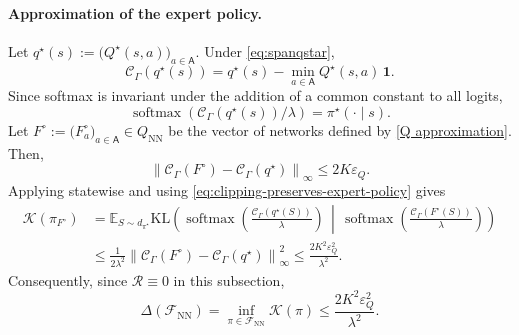 \documentclass{article}
\theoremstyle{definition}
\theoremstyle{remark}
\theoremstyle{plain}
\newcommand{\E}{\mathbb{E}}
\newcommand{\KL}{\mathrm{KL}}
\numberwithin{equation}{section}
\begin{document}
\paragraph{Approximation of the expert policy.} Let
\(
    q^\star(s)
    :=
    \bigl(
        Q^\star(s,a)
    \bigr)_{a\in\mathsf A}.
\)
Under \eqref{eq:spanqstar},
\begin{equation}
\label{eq:clipping-preserves-expert-policy}
    \mathcal C_\Gamma(q^\star(s))
    =
    q^\star(s)
    -
    \min_{a\in\mathsf A}Q^\star(s,a)\,\mathbf 1.
\end{equation}
Since softmax is invariant under the addition of a common constant to
all logits,
\[
    \operatorname{softmax}
    \left(
        {\mathcal C_\Gamma(q^\star(s))}/{\lambda}
    \right)
    =
    \pi^\star(\cdot\mid s).
\]
Let
\(
    F^\circ
    :=
    \bigl(
        F_a^\circ
    \bigr)_{a\in\mathsf A}
    \in
     Q_{\mathrm{NN}}
\)
be the vector of networks defined by
\eqref{Q approximation}. Then,
\begin{equation}
\label{eq:clipped-logit-approximation}
    \left\|
        \mathcal C_\Gamma(F^\circ)
        -
        \mathcal C_\Gamma(q^\star)
    \right\|_\infty
    \leq
    2K\varepsilon_Q.
\end{equation}
Applying  statewise and using
\eqref{eq:clipping-preserves-expert-policy} gives
\begin{align}
    \mathcal K(\pi_{F^\circ})
    &=
    \E_{S\sim d_{\pi^\star}}
    \KL\left(
        \operatorname{softmax}
        \left(
            \frac{\mathcal C_\Gamma(q^\star(S))}{\lambda}
        \right)
        \,\middle|\,
        \operatorname{softmax}
        \left(
            \frac{\mathcal C_\Gamma(F^\circ(S))}{\lambda}
        \right)
    \right)
    \nonumber\\
    &\leq
    \frac{1}{2\lambda^2}
    \left\|
        \mathcal C_\Gamma(F^\circ)
        -
        \mathcal C_\Gamma(q^\star)
    \right\|_\infty^2
    \leq
    \frac{2K^2\varepsilon_Q^2}{\lambda^2}.
\label{E est}
\end{align}
Consequently, since \(\mathcal R\equiv0\) in this subsection,
\begin{equation}
\label{eq:ReLU-approximation-error}
    \Delta(\mathcal F_{\mathrm{NN}})
    =
    \inf_{\pi\in\mathcal F_{\mathrm{NN}}}
    \mathcal K(\pi)
    \leq
    \frac{2K^2\varepsilon_Q^2}{\lambda^2}.
\end{equation}
\end{document}
